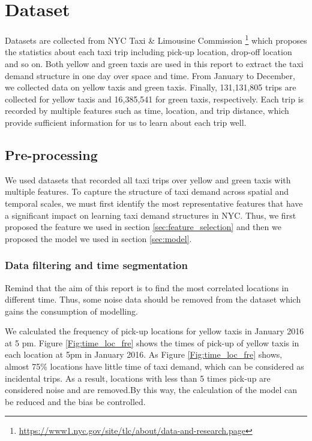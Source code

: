 \documentclass[11pt]{article}
\begin{document}
\section{Dataset}
Datasets are collected from NYC Taxi \& Limousine Commission \footnote{\url{https://www1.nyc.gov/site/tlc/about/data-and-research.page}} which proposes the statistics about each taxi trip including pick-up location, drop-off location and so on. Both yellow and green taxis are used in this report to extract the taxi demand structure in one day over space and time. From January to December, we collected data on yellow taxis and green taxis. Finally, 131,131,805 trips are collected for yellow taxis and 16,385,541 for green taxis, respectively. Each trip is recorded by multiple features such as time, location, and trip distance, which provide sufficient information for us to learn about each trip well.

\subsection{Pre-processing}
We used datasets that recorded all taxi trips over yellow and green taxis with multiple features. To capture the structure of taxi demand across spatial and temporal scales, we must first identify the most representative features that have a significant impact on learning taxi demand structures in NYC. Thus, we first proposed the feature we used in section \ref{sec:feature_selection} and then we proposed the model we used in section \ref{sec:model}.

\subsubsection{Data filtering and time segmentation}
Remind that the aim of this report is to find the most correlated locations in different time. Thus, some noise data should be removed from the dataset which gains the consumption of modelling. 

We calculated the frequency of pick-up locations for yellow taxis in January 2016 at 5 pm. Figure \ref{Fig:time_loc_fre} shows the times of pick-up of yellow taxis in each location at 5pm in January 2016. As Figure \ref{Fig:time_loc_fre} shows, almost 75\% locations have little time of taxi demand, which can be considered as incidental trips. As a result, locations with less than 5 times pick-up are considered noise and are removed.By this way, the calculation of the model can be reduced and the bias be controlled.
\end{document}
